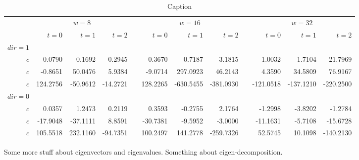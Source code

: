  \newcommand{\ra}[1]{\renewcommand{\arraystretch}{#1}}
\begin{sidewaystable*}\centering
\ra{1.3}
\begin{tabular}{@{}rrrrcrrrcrrr@{}}\toprule
& \multicolumn{3}{c}{$w = 8$} & \phantom{abc}& \multicolumn{3}{c}{$w = 16$} &
\phantom{abc} & \multicolumn{3}{c}{$w = 32$}\\ \cmidrule{2-4} \cmidrule{6-8} \cmidrule{10-12}
& $t=0$ & $t=1$ & $t=2$ && $t=0$ & $t=1$ & $t=2$ && $t=0$ & $t=1$ & $t=2$\\ \midrule
$dir=1$\\
$c$ & 0.0790 & 0.1692 & 0.2945 && 0.3670 & 0.7187 & 3.1815 && -1.0032 & -1.7104 & -21.7969\\
$c$ & -0.8651& 50.0476& 5.9384&& -9.0714& 297.0923& 46.2143&& 4.3590& 34.5809& 76.9167\\
$c$ & 124.2756& -50.9612& -14.2721&& 128.2265& -630.5455& -381.0930&& -121.0518& -137.1210& -220.2500\\ $dir=0$\\
$c$ & 0.0357& 1.2473& 0.2119&& 0.3593& -0.2755& 2.1764&& -1.2998& -3.8202& -1.2784\\
$c$ & -17.9048& -37.1111& 8.8591&& -30.7381& -9.5952& -3.0000&& -11.1631& -5.7108& -15.6728\\
$c$ & 105.5518& 232.1160& -94.7351&& 100.2497& 141.2778& -259.7326&& 52.5745& 10.1098& -140.2130\\ \bottomrule
\end{tabular}
\caption{Caption}
\end{sidewaystable*}


Some more stuff about eigenvectors and 
eigenvalues. Something about 
eigen-decomposition. 


